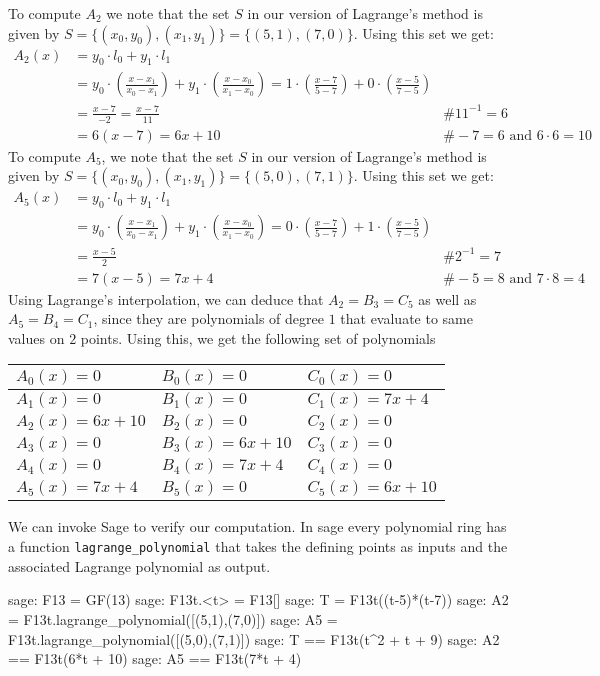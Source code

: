 \begin{example}
To compute $A_2$ we note that the set $S$ in our version of Lagrange's method  is given by $S=\{(x_0,y_0), (x_1,y_1)\} = \{(5,1), (7,0)\}$. Using this set we get:
\begin{align*}
A_2(x) & = y_0\cdot l_0 + y_1\cdot l_1 \\
    & = y_0\cdot(\frac{x-x_1}{x_0-x_1}) + y_1\cdot(\frac{x-x_0}{x_1-x_0})
      = 1\cdot(\frac{x-7}{5-7}) + 0\cdot(\frac{x-5}{7-5}) \\
    & = \frac{x-7}{-2}
      = \frac{x-7}{11} & \text{\# } 11^{-1}=6 \\
    & = 6(x-7) 
      = 6x + 10 & \text{\# } -7 = 6 \text{ and } 6\cdot 6 = 10
\end{align*}
To compute $A_5$, we note that the set $S$ in our version of Lagrange's method  is given by $S=\{(x_0,y_0), (x_1,y_1)\} = \{(5,0), (7,1)\}$. Using this set we get:
\begin{align*}
A_5(x) & = y_0\cdot l_0 + y_1\cdot l_1 \\
    & = y_0\cdot(\frac{x-x_1}{x_0-x_1}) + y_1\cdot(\frac{x-x_0}{x_1-x_0})
      = 0\cdot(\frac{x-7}{5-7}) + 1\cdot(\frac{x-5}{7-5}) \\
    & = \frac{x-5}{2} & \text{\# } 2^{-1}=7 \\
    & = 7(x-5) 
      = 7x + 4 & \text{\# } -5 = 8 \text{ and } 7\cdot 8 = 4
\end{align*}
Using Lagrange's interpolation, we can deduce that $A_2=B_3=C_5$ as well as $A_5=B_4=C_1$, since they are polynomials of degree $1$ that evaluate to same values on $2$ points. Using this, we get the following set of polynomials
\begin{center}
\begin{tabular}{|l|l|l|}\hline 
$A_{0}(x)=0 $ &$ B_{0}(x)=0   $ & $C_{0}(x)=0$ \tabularnewline\hline 
$A_1(x)=0 $ &$ B_1(x)=0   $ & $C_1(x)=7x+4$ \tabularnewline\hline 
$A_2(x)=6x+10$ &$ B_2(x)=0$ & $C_2(x)=0$ \tabularnewline\hline 
$A_3(x)=0    $ &$ B_3(x)=6x+10$ & $C_3(x)=0$ \tabularnewline\hline 
$A_4(x)=0$ &$ B_4(x)=7x+4  $ & $C_4(x)=0$ \tabularnewline\hline 
$A_5(x)=7x+4$ &$ B_5(x)=0      $ & $C_5(x)=6x+10$ \tabularnewline\hline 
\end{tabular}
\end{center}
We can invoke Sage to verify our computation. In sage every polynomial ring has a function \texttt{lagrange\_polynomial} that takes the defining points as inputs and the associated Lagrange polynomial as output.
\begin{sagecommandline}
sage: F13 = GF(13)
sage: F13t.<t> = F13[]
sage: T = F13t((t-5)*(t-7))
sage: A2 = F13t.lagrange_polynomial([(5,1),(7,0)])
sage: A5 = F13t.lagrange_polynomial([(5,0),(7,1)])
sage: T == F13t(t^2 + t + 9)
sage: A2 == F13t(6*t + 10)
sage: A5 == F13t(7*t + 4)
\end{sagecommandline}


\end{example}
